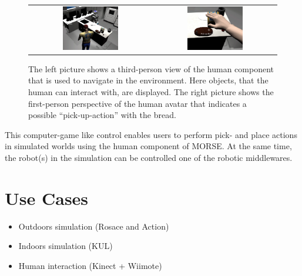 \documentclass{llncs}
\begin{document}
\begin{figure}[h!]
\centering
\begin{tabular}{cc}
 \includegraphics[width=0.475\textwidth]{pics/human_control_1.png} & \includegraphics[width=0.475\textwidth]{pics/human_control_2.png}
\end{tabular}
\caption{The left picture shows a third-person view of the human component that is used to navigate in the environment. Here
objects, that the human can interact with, are displayed. The right picture shows the first-person perspective of the human 
avatar that indicates a possible ``pick-up-action'' with the bread.}
\label{fig:human_control}
\end{figure}

This computer-game like control enables users to perform pick- and place actions in simulated worlds using the 
human component of MORSE. At the same time, the robot(s) in the simulation can be controlled one of the robotic middlewares. 

\section{Use Cases}

\begin{itemize}
  \item Outdoors simulation (Rosace \cite{springerlink:10.1007/978-3-642-12384-9_18,springerlink:10.1007/978-3-642-28786-2_32} and Action)
  \item Indoors simulation (KUL)
  \item Human interaction (Kinect + Wiimote)
\end{itemize}
\end{document}
